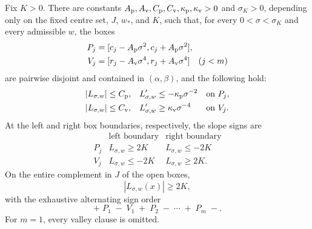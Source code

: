 \begin{lemma}
\label{lem:exactmfull-posterior-sectors}
Fix \(K>0\).  There are constants
\(A_{\rm p},A_{\rm v},C_{\rm p},C_{\rm v},
\kappa_{\rm p},\kappa_{\rm v}>0\) and \(\sigma_K>0\), depending only on the
fixed centre set, \(J\), \(w_*\), and \(K\), such that, for every
\(0<\sigma<\sigma_K\) and every admissible \(w\), the boxes
\begin{align}
 P_j&=[c_j-A_{\rm p}\sigma^2,c_j+A_{\rm p}\sigma^2],
 \label{eq:exactmfull-peak-boxes}\\
 V_j&=[r_j-A_{\rm v}\sigma^4,r_j+A_{\rm v}\sigma^4]
 \quad(j<m)
 \label{eq:exactmfull-valley-boxes}
\end{align}
are pairwise disjoint and contained in \((\alpha,\beta)\), and the following
hold:
\begin{align}
 |L_{\sigma,w}|&\le C_{\rm p},&
 L_{\sigma,w}'&\le-\kappa_{\rm p}\sigma^{-2}
 &&\text{on }P_j,
 \label{eq:exactmfull-peak-box-control}\\
 |L_{\sigma,w}|&\le C_{\rm v},&
 L_{\sigma,w}'&\ge \kappa_{\rm v}\sigma^{-4}
 &&\text{on }V_j.
 \label{eq:exactmfull-valley-box-control}
\end{align}
At the left and right box boundaries, respectively, the slope signs are
\begin{equation}
 \begin{array}{c|cc}
 &\text{left boundary}&\text{right boundary}\\ \hline
 P_j&L_{\sigma,w}\ge2K&L_{\sigma,w}\le-2K\\
 V_j&L_{\sigma,w}\le-2K&L_{\sigma,w}\ge2K.
 \end{array}
 \label{eq:exactmfull-box-boundary-signs}
\end{equation}
On the entire complement in \(J\) of the open boxes,
\begin{equation}
 |L_{\sigma,w}(x)|\ge2K,
 \label{eq:exactmfull-complement-margin}
\end{equation}
with the exhaustive alternating sign order
\begin{equation}
 +\;P_1\;-\;V_1\;+\;P_2\;-\;\cdots\;+\;P_m\;-.
 \label{eq:exactmfull-complement-sign-order}
\end{equation}
For \(m=1\), every valley clause is omitted.
\end{lemma}

